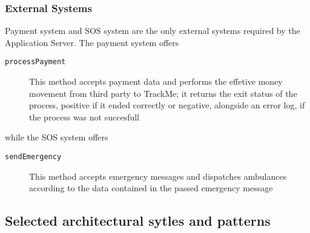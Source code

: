 \documentclass[../DD0.tex]{subfiles}
\begin{document}
    \subsubsection{External Systems}

      Payment system and SOS system are the only external systems required by the Application Server. The payment system offers
      \begin{description}
        \item[\texttt{processPayment}] This method accepts payment data and performs the effetive money movement from third party to TrackMe; it returns the exit status of the process, positive if it ended correctly or negative, alongside an error log, if the process was not succesfull
      \end{description}
      while the SOS system offers
      \begin{description}
        \item[\texttt{sendEmergency}] This method accepts emergency messages and dispatches ambulances according to the data contained in the passed emergency message
      \end{description}

  \subsection{Selected architectural sytles and patterns}
  \label{sec:stylesandpatterns}
\end{document}
